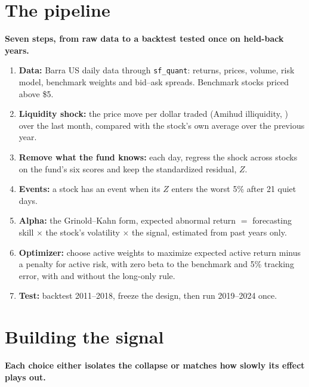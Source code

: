 \documentclass[11pt]{article}
\newcommand{\takeaway}[1]{\noindent\textbf{#1}\par\smallskip}
\begin{document}
\section{The pipeline}\label{sec:signal}
\takeaway{Seven steps, from raw data to a backtest tested once on held-back years.}

\begin{enumerate}
  \item \textbf{Data:} Barra US daily data through \texttt{sf\_quant}: returns, prices, volume, risk model, benchmark
        weights and bid--ask spreads. Benchmark stocks priced above \$5.
  \item \textbf{Liquidity shock:} the price move per dollar traded (Amihud illiquidity, \citealp{amihud2002}) over the last month, compared
        with the stock's own average over the previous year.
  \item \textbf{Remove what the fund knows:} each day, regress the shock across stocks on the fund's six scores and keep
        the standardized residual, $Z$.
  \item \textbf{Events:} a stock has an event when its $Z$ enters the worst 5\% after 21 quiet days.
  \item \textbf{Alpha:} the Grinold--Kahn form, expected abnormal return $=$ forecasting skill $\times$ the stock's
        volatility $\times$ the signal, estimated from past years only.
  \item \textbf{Optimizer:} choose active weights to maximize expected active return minus a penalty for active risk,
        with zero beta to the benchmark and 5\% tracking error, with and without the long-only rule.
  \item \textbf{Test:} backtest 2011--2018, freeze the design, then run 2019--2024 once.
\end{enumerate}

\section{Building the signal}
\takeaway{Each choice either isolates the collapse or matches how slowly its effect plays out.}
\end{document}
